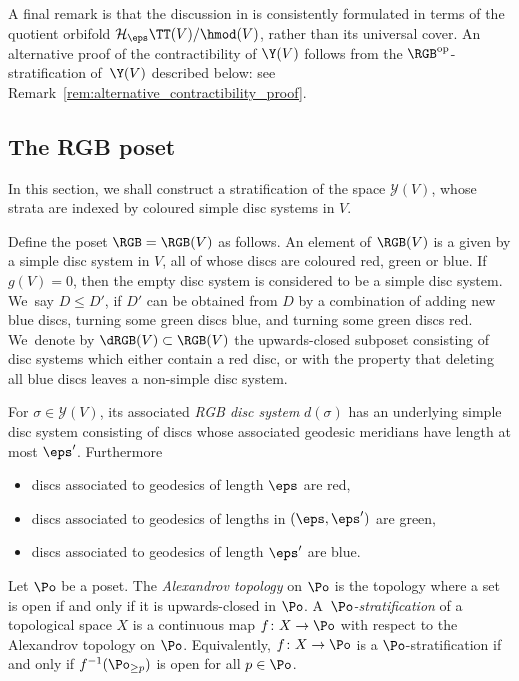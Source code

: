 A final remark is that the discussion in \cite{hainautpetersen} is consistently formulated in terms of the quotient orbifold $\mathcal{H}_\eps\TT(V)/\hmod(V)$, rather than its universal cover. An alternative proof of the contractibility of $\Y(V)$ follows from the $\RGB^\textnormal{op}$-stratification of~$\Y(V)$ described below: see Remark~\ref{rem:alternative_contractibility_proof}.

\subsection{The RGB poset}

In this section, we shall construct a stratification of the space $\mathcal Y(V)$, whose strata are indexed by coloured simple disc systems in $V$.

\begin{defn} Define the poset $\RGB=\RGB(V)$ as follows. An element of $\RGB(V)$ is a given by a simple disc system in $V$, all of whose discs are coloured red, green or blue. If~$g(V)=0$, then the empty disc system is considered to be a simple disc system. We~say $D \leq D'$, if $D'$ can be obtained from $D$ by a combination of adding new blue discs, turning some green discs blue, and turning some green discs red. We~denote by $\dRGB(V) \subset \RGB(V)$ the upwards-closed subposet consisting of disc systems which either contain a red disc, or with the property that deleting all blue discs leaves a non-simple disc system.
\end{defn}

\begin{defn} \label{def of RGB stratification}
For $\sigma \in \mathcal{Y}(V)$, its associated \emph{RGB disc system} $d(\sigma)$ has an underlying simple disc system consisting of discs whose associated geodesic meridians have length at most $\eps'$. Furthermore
\begin{itemize}
	\item discs associated to geodesics of length $\eps$ are red,
	\item discs associated to geodesics of lengths in $(\eps,\eps')$ are green,
	\item discs associated to geodesics of length $\eps'$ are blue.
\end{itemize}
\end{defn}

\begin{defn}
Let $\Po$ be a poset. The \emph{Alexandrov topology} on $\Po$ is the topology where a set is open if and only if it is upwards-closed in $\Po$. A~\emph{$\Po$-stratification} of a topological space $X$ is a continuous map $f \colon X \to \Po$ with respect to the Alexandrov topology on $\Po$. Equivalently, $f \colon X \to \Po$ is a $\Po$-stratification if and only if $f^{-1}(\Po_{\geq p})$ is open for all $p \in \Po$.
\end{defn}

